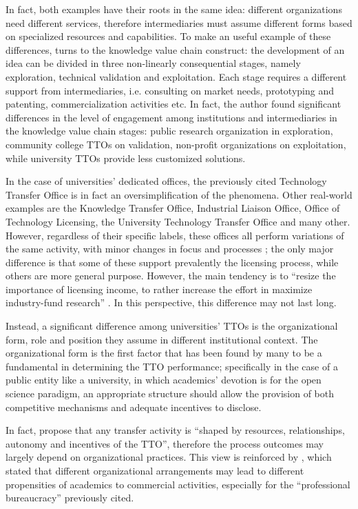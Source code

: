 In fact, both examples have their roots in the same idea: different organizations need different services, therefore intermediaries must assume different forms based on specialized resources and capabilities. To make an useful example of these differences, \citet{Landry2013} turns to the knowledge value chain construct: the development of an idea can be divided in three non-linearly consequential stages, namely exploration, technical validation and exploitation. Each stage requires a different support from intermediaries, i.e. consulting on market needs, prototyping and patenting, commercialization activities etc. In fact, the author found significant differences in the level of engagement among institutions and intermediaries in the knowledge value chain stages: public research organization in exploration, community college TTOs on validation, non-profit organizations on exploitation, while university TTOs provide less customized solutions.

In the case of universities' dedicated offices, the previously cited Technology Transfer Office is in fact an oversimplification of the phenomena. Other real-world examples are the Knowledge Transfer Office, Industrial Liaison Office, Office of Technology Licensing, the University Technology Transfer Office and many other. However, regardless of their specific labels, these offices all perform variations of the same activity, with minor changes in focus and processes \citep{Brescia2016}; the only major difference is that some of these support prevalently the licensing process, while others are more general purpose. However, the main tendency is to \enquote{resize the importance of licensing income, to rather increase the effort in maximize industry-fund research} \citep{Balderi2010}. In this perspective, this difference may not last long. 

Instead, a significant difference among universities' TTOs is the organizational form, role and position they assume in different institutional context. The organizational form is the first factor that has been found by many to be a fundamental in determining the TTO performance; specifically in the case of a public entity like a university, in which academics' devotion is for the open science paradigm, an appropriate structure should allow the provision of both competitive mechanisms and adequate incentives to disclose. 

In fact, \citet{Bercovitz2001} propose that any transfer activity is \enquote{shaped by resources, relationships, autonomy and incentives of the TTO}, therefore the process outcomes may largely depend on organizational practices. This view is reinforced by \citet{Debackere2005}, which stated that different organizational arrangements may lead to different propensities of academics to commercial activities, especially for the \enquote{professional bureaucracy} previously cited. 

